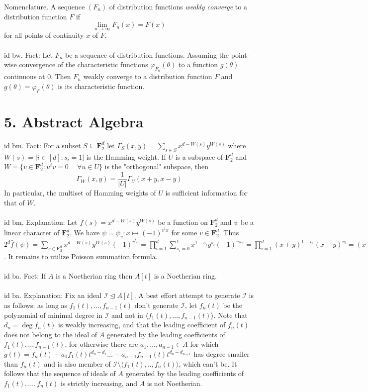 \documentclass[oneside]{book}
\newcommand{\sub}{\subseteq}
\newcommand{\vphi}{\varphi}
\newcommand{\F}{\mathbf{F}}
\newcommand{\II}{\mathscr{I}}
\newcommand{\ideal}{\trianglelefteq}
\newcommand{\set}[1]{\{ #1\}}
\newcommand{\gen}[1]{\langle #1\rangle}
\newcommand{\abs}[1]{\left\lvert #1\right\rvert}
\newcommand{\spc}{\phantom{-}}
\newcommand\chap[1]{%
  \chapter*{#1}%
  \addcontentsline{toc}{chapter}{#1}}
\begin{document}
Nomenclature. A sequence $(F_n)$ of distribution functions {\it weakly converge} to a distribution function $F$ if $$\lim_{n\to\infty}F_n(x)=F(x)$$
for all points of continuity $x$ of $F$.    \\\\


id bw. Fact: Let $F_n$ be a sequence of distribution functions. Assuming the point-wise convergence of the characteristic functions $\vphi_{F_n}(\theta)$ to a function $g(\theta)$ continuous at $0$. Then $F_n$ weakly converge to a distribution function $F$ and $g(\theta)=\vphi_F(\theta)$ is its characteristic function. 


\newpage
\chap{5. Abstract Algebra}
id bm. Fact: For a subset $S\sub \F_2^d$ let $\Gamma_S(x,y)=\displaystyle\sum_{s\in S}x^{d-W(s)}y^{W(s)}$ where $W(s)=\abs{i\in [d]:s_i=1}$ is the Hamming weight. If $U$ is a subspace of $\F_2^d$ and $W=\set{v\in \F_2^d: u^tv=0 \spc\forall u\in U}$ is the "orthogonal" subspace, then $$\Gamma_W(x,y)=\dfrac{1}{\abs{U}}\Gamma_U(x+y,x-y)$$
In particular, the multiset of Hamming weights of $U$ is sufficient information for that of $W$.    \\\\


id bm. Explanation: Let $f(s)=x^{d-W(s)}y^{W(s)}$ be a function on $\F_2^d$ and $\psi$ be a linear character of $\F_2^d$. We have $\psi=\psi_v:x\mapsto (-1)^{v^tx}$ for some $v\in \F_2^d$. Thus $2^d\hat{f}(\psi)=\sum_{s\in\F_2^d} x^{d-W(s)}y^{W(s)}(-1)^{v^ts}=\prod_{i=1}^d\sum_{s_i=0}^1  x^{1-s_i}y^{s_i}(-1)^{v_is_i}=\prod_{i=1}^d (x+y)^{1-v_i}(x-y)^{v_i}=(x+y)^{d-W(v)}(x-y)^{W(v)}$. It remains to utilize Poisson summation formula. \\\\


id ba. Fact: If $A$ is a Noetherian ring then $A[t]$ is a Noetherian ring.  \\\\


id ba. Explanation: Fix an ideal $\II\ideal A[t]$. A best effort attempt to generate $\II$ is as follows: as long as $f_1(t),...,f_{n-1}(t)$ don't generate $\II$, let $f_n(t)$ be the polynomial of minimal degree in $\II$ and not in $\gen{f_1(t),\dots,f_{n-1}(t)}$. Note that $d_n=\deg f_n(t)$ is weakly increasing, and that the leading coefficient of $f_n(t)$ does not belong to the ideal of $A$ generated by the leading coefficients of  $f_1(t),..,f_{n-1}(t)$, for otherwise there are $a_1,\dots,a_{n-1}\in A$ for which $g(t)=f_n(t)-a_1f_1(t)t^{d_n-d_1}\dots-a_{n-1}f_{n-1}(t)t^{d_n-d_{n-1}}$ has degree smaller than $f_n(t)$ and is also member of $\II\setminus \gen{f_1(t),..,f_n(t)}$, which can't be. It follows that the sequence of ideals of $A$ generated by the leading coefficients of $f_1(t),\dots,f_n(t)$ is strictly increasing, and $A$ is not Noetherian. \\\\
\end{document}

